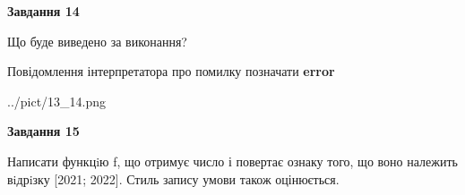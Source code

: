 \documentclass[11pt, ukrainian]{article}
\begin{document}
{\begin {large}
{\begin {center}\textbf{Завдання 14}\end {center}}\par
Що буде виведено за виконання? \par
Повідомлення інтерпретатора про помилку позначати \textbf{error}

\begin{center}
	{../pict/13_14.png}
\end{center}
\newpage

{\begin {center}\textbf{Завдання 15}\end {center}}\par

Написати функцiю f, що отримує число і повертає ознаку того, що воно належить вiдрiзку [2021; 2022]. Стиль запису умови також оцінюється.\par
\newpage

\end {large}}
\end{document}

